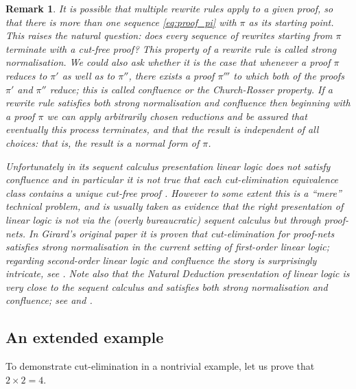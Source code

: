 \documentclass[english,letter paper,12pt,reqno]{article}
\theoremstyle{example}
\newtheorem{remark}[theorem]{Remark}
\numberwithin{equation}{section}
\begin{document}
\begin{remark} It is possible that multiple rewrite rules apply to a given proof, so that there is more than one sequence \eqref{eq:proof_pi} with $\pi$ as its starting point. This raises the natural question: does \emph{every} sequence of rewrites starting from $\pi$ terminate with a cut-free proof? This property of a rewrite rule is called \emph{strong normalisation}. We could also ask whether it is the case that whenever a proof $\pi$ reduces to $\pi'$ as well as to $\pi''$, there exists a proof $\pi'''$ to which both of the proofs $\pi'$ and $\pi''$ reduce; this is called \emph{confluence} or the \emph{Church-Rosser property}. If a rewrite rule satisfies both strong normalisation and confluence then beginning with a proof $\pi$ we can apply arbitrarily chosen reductions and be assured that eventually this process terminates, and that the result is independent of all choices: that is, the result is a \emph{normal form} of $\pi$.

Unfortunately in its sequent calculus presentation linear logic does \emph{not} satisfy confluence and in particular it is not true that each cut-elimination equivalence class contains a unique cut-free proof \cite[\S 1.3.1]{girard_prooftypes}. However to some extent this is a ``mere'' technical problem, and is usually taken as evidence that the right presentation of linear logic is not via the (overly bureaucratic) sequent calculus but through \emph{proof-nets}. In Girard's original paper \cite[III.3]{girard_llogic} it is proven that cut-elimination for proof-nets satisfies strong normalisation in the current setting of first-order linear logic; regarding second-order linear logic and confluence the story is surprisingly intricate, see \cite{pagani}. Note also that the Natural Deduction presentation of linear logic is very close to the sequent calculus and satisfies both strong normalisation and confluence; see \cite{benton_strong} and \cite[\S 2.2]{brauner}.
\end{remark}

\subsection{An extended example}

To demonstrate cut-elimination in a nontrivial example, let us prove that $2 \times 2 = 4$.
\end{document}
